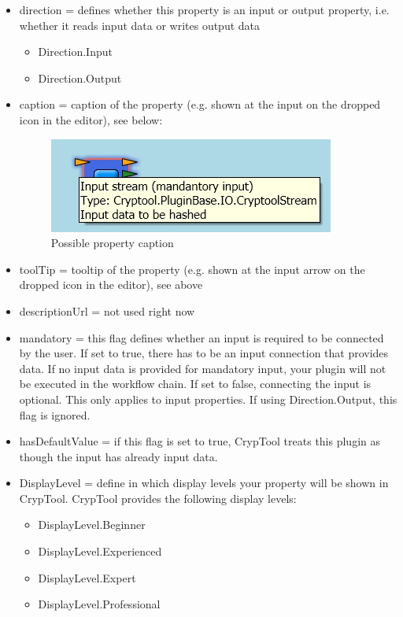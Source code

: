 \begin{itemize}
	\item direction = defines whether this property is an input or output property, i.e. whether it reads input data or writes output data
	\begin{itemize}
		\item Direction.Input
		\item Direction.Output
	\end{itemize}
	\item caption = caption of the property (e.g. shown at the input on the dropped icon in the editor), see below:
\begin{figure}[h]
	\centering
		\includegraphics{figures/property_caption.jpg}
	\caption{Possible property caption}
	\label{fig:property_caption}
\end{figure}
	\item toolTip = tooltip of the property (e.g. shown at the input arrow on the dropped icon in the editor), see above
	\item descriptionUrl = not used right now
	\item mandatory = this flag defines whether an input is required to be connected by the user. If set to true, there has to be an input connection that provides data. If no input data is provided for mandatory input, your plugin will not be executed in the workflow chain. If set to false, connecting the input is optional. This only applies to input properties. If using Direction.Output, this flag is ignored.
	\item hasDefaultValue = if this flag is set to true, CrypTool treats this plugin as though the input has already input data.
	\item DisplayLevel = define in which display levels your property will be shown in CrypTool. CrypTool provides the following display levels:
	\begin{itemize}
		\item DisplayLevel.Beginner
		\item DisplayLevel.Experienced
		\item DisplayLevel.Expert
		\item DisplayLevel.Professional
	\end{itemize}

\end{itemize}
